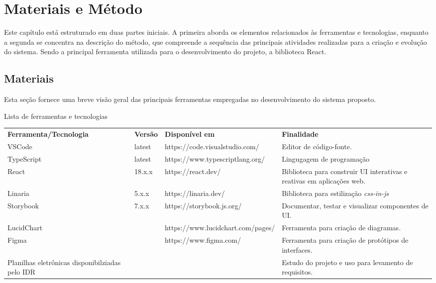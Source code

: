 
\chapter{Materiais e Método}\label{cap:materialemetodos}

Este capítulo está estruturado em duas partes iniciais. A primeira aborda os elementos relacionados às ferramentas e tecnologias, enquanto a segunda se concentra na descrição do método, que compreende a sequência das principais atividades realizadas para a criação e evolução do sistema. Sendo a principal ferramenta utilizada para o desenvolvimento do projeto, a biblioteca React.

\section{Materiais}\label{sec:materiais}

Esta seção fornece uma breve visão geral das principais ferramentas empregadas no desenvolvimento do sistema proposto.

\begin{tabframed}[htb]
  \caption{Lista de ferramentas e tecnologias}
  \label{quad:materiais}
  \renewcommand{\arraystretch}{2}
  \begin{tabular}{|l|l|l|l|}
    \cline{1-4}
    \textbf{Ferramenta/Tecnologia} & \textbf{Versão} & \textbf{Disponível em}          & \textbf{Finalidade}                                                         \\ \cline{1-4}
    \gls{VSCode} & latest & https://code.visualstudio.com/ & Editor de código-fonte. \\ \cline{1-4}
    TypeScript                     & latest          & https://www.typescriptlang.org/ & Lingugagem de programação                                                   \\ \cline{1-4}
    React                          & 18.x.x          & https://react.dev/              & Biblioteca para construir \gls{UI} interativas e reativas em aplicações web. \\ \cline{1-4}
    Linaria                        & 5.x.x           & https://linaria.dev/            & Biblioteca para estilização \textit{css-in-js}                              \\ \cline{1-4}
    Storybook                      & 7.x.x           & https://storybook.js.org/       & Documentar, testar e visualizar componentes de \gls{UI}. \\ \cline{1-4}
    LucidChart                    &     & https://www.lucidchart.com/pages/         & Ferramenta para criação de diagramas.                                      \\ \cline{1-4}
    Figma &  & https://www.figma.com/ & Ferramenta para criação de protótipos de interfaces. \\ \cline{1-4}
    Planilhas eletrônicas disponibilziadas pelo IDR & & & Estudo do projeto e uso para levamento de requisitos. \\ \cline{1-4}
  \end{tabular}
  \fonte{}%
\end{tabframed}

